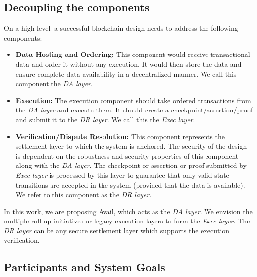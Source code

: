 \documentclass[sigconf, screen=true, nonacm]{acmart}
\newcommand{\DA}{\textit{DA layer}}
\newcommand{\EX}{\textit{Exec layer}}
\newcommand{\DR}{\textit{DR layer}}
\begin{document}
    \subsection{Decoupling the components}
        On a high level, a successful blockchain design needs to address the following components:
        \begin{itemize}
            \item \textbf{Data Hosting and Ordering:} This component would receive transactional data and order it without any execution. It would then store the data and ensure complete data availability in a decentralized manner. We call this component the \DA.
            \item \textbf{Execution:} The execution component should take ordered transactions from the \DA{} and execute them. It should create a checkpoint/assertion/proof and submit it to the \DR. We call this the \EX.
            \item \textbf{Verification/Dispute Resolution:} This component represents the settlement layer to which the system is anchored. The security of the design is dependent on the robustness and security properties of this component along with the \DA. The checkpoint or assertion or proof submitted by \EX{} is processed by this layer to guarantee that only valid state transitions are accepted in the system (provided that the data is available). We refer to this component as the \DR. 
        \end{itemize}

        In this work, we are proposing Avail, which acts as the \DA. We envision the multiple roll-up initiatives or legacy execution layers to form the \EX. The \DR{} can be any secure settlement layer which supports the execution verification.
    
    \subsection{Participants and System Goals}
\end{document}
